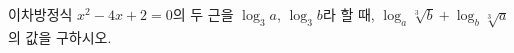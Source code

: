 이차방정식 $x^2-4x+2=0$의 두 근을 $\log_3 a$, $\log_3 b$라 할 때, $\log_a\sqrt[3]{b}+\log_b\sqrt[3]{a}$의 값을 구하시오.
